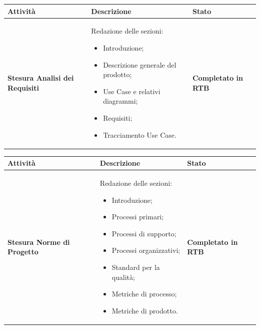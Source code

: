 \documentclass[a4paper,12pt]{article}
\begin{document}
	    {\renewcommand{\arraystretch}{1.4}
            \begin{table}[H]
            \centering
            \begin{tabularx}{\textwidth}{|X|X|X|}
                \hline
                \rowcolor{gold}
		    \textbf{Attività} & \textbf{Descrizione} & \textbf{Stato}\\
                \hline
		    \textbf{Stesura Analisi dei Requisiti} & Redazione delle sezioni:
		    \begin{itemize}
			    \item Introduzione;
			    \item Descrizione generale del prodotto;
			    \item Use Case e relativi diagrammi;
			    \item Requisiti;
			    \item Tracciamento Use Case.
		    \end{itemize}		    & \textbf{Completato in RTB} \\
            \hline
                  \end{tabularx}      
            \end{table}
        }
        {\renewcommand{\arraystretch}{1.4}
            \begin{table}[H]
            \centering
            \begin{tabularx}{\textwidth}{|X|X|X|}
                \hline
                \rowcolor{gold}
		    \textbf{Attività} & \textbf{Descrizione} & \textbf{Stato}\\
                \hline
		      \textbf{Stesura Norme di Progetto} & Redazione delle sezioni:
		    \begin{itemize}
			    \item Introduzione;
			    \item Processi primari;
			    \item Processi di supporto;
			    \item Processi organizzativi;
			    \item Standard per la qualità;
			    \item Metriche di processo;
			    \item Metriche di prodotto.
		    \end{itemize}		    & \textbf{Completato in RTB} \\
            \hline
                  \end{tabularx}      
            \end{table}
        }
\end{document}
